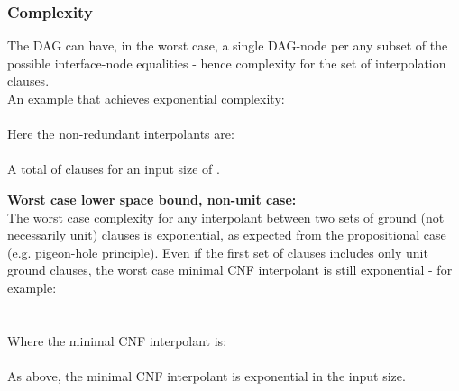 \subsubsection*{Complexity}
The DAG can have, in the worst case, a single DAG-node per any subset of the possible interface-node equalities - hence  complexity for the set of interpolation clauses.\\
An example that achieves exponential complexity:\\
\\
Here the non-redundant interpolants are:\\
\\
A total of  clauses for an input size of .

\textbf{Worst case lower space bound, non-unit case:}\\
The worst case complexity for any interpolant between two sets of ground (not necessarily unit) clauses is exponential, as expected from the propositional case (e.g. pigeon-hole principle).
Even if the first set of clauses includes only unit ground clauses, the worst case minimal CNF interpolant is still exponential - for example:\\
\\
\\
Where the minimal CNF interpolant is:\\
\\
As above, the minimal CNF interpolant is exponential in the input size.


